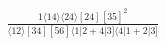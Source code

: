\documentclass[varwidth, border=5pt]{standalone}
\begin{document}
\begin{my}
$\begin{gathered}
\scriptscriptstyle\frac{1⟨14⟩⟨24⟩[24][35]^2}{⟨12⟩[34][56]⟨1|2+4|3]⟨4|1+2|3]}
\end{gathered}$
\end{my}
\end{document}
